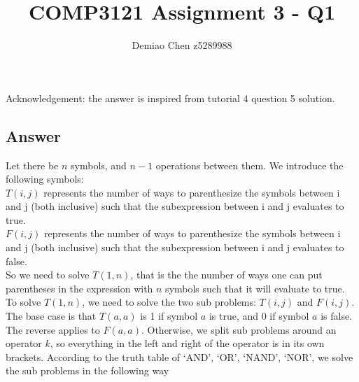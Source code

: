 \documentclass[12pt]{article}
\title{COMP3121 Assignment 3 - Q1}
\author{Demiao Chen z5289988}
\begin{document}
\maketitle
{}
Acknowledgement: the answer is inspired from tutorial 4 question 5 solution.

\subsection*{Answer}

Let there be $n$ symbols, and $n - 1$ operations between them. We introduce the
following symbols: \\
$T(i, j)$ represents the number of ways to parenthesize the 
symbols between i and j (both inclusive) such that the 
subexpression between i and j evaluates to true. \\  
$F(i, j)$ 
represents the number of ways to parenthesize the 
symbols between i and j (both inclusive) such that the 
subexpression between i and j evaluates to false. \\ 
So we need to solve $T(1, n)$, that is the the 
number of ways one can put parentheses
in the expression with $n$ symbols such that it
 will evaluate to true. To solve $T(1, n)$, we need to solve the two sub problems: 
 $T(i, j)$ and $F(i, j)$. \\
 The base case is 
  that $T(a, a)$ is 1 if symbol $a$ is true, and 0 if symbol $a$ is false. 
 The reverse applies to $F(a, a)$. Otherwise, we split sub problems around an operator $k$,
 so everything 
 in the left and right of the operator is in its own brackets. According to the truth table of
 `AND', `OR', `NAND', `NOR',
 we solve the sub problems in the following way 
\end{document}
